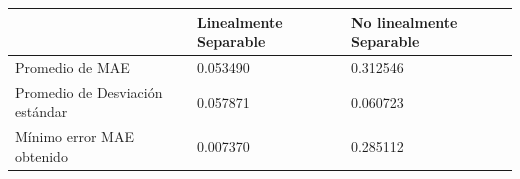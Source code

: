 \begin{tabular}{lll}
\toprule
  & Linealmente Separable & No linealmente Separable \\
\midrule
Promedio de MAE & 0.053490 & 0.312546 \\
Promedio de Desviación estándar & 0.057871 & 0.060723 \\
Mínimo error MAE obtenido & 0.007370 & 0.285112 \\
\bottomrule
\end{tabular}
